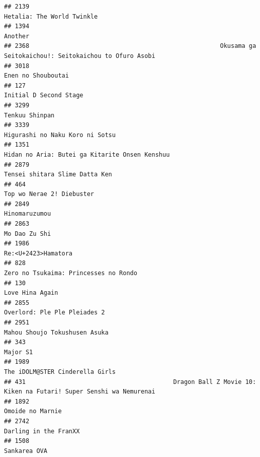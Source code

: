 \documentclass[
]{article}
\begin{document}
\begin{verbatim}
## 2139                                                                                Hetalia: The World Twinkle
## 1394                                                                                                   Another
## 2368                                                     Okusama ga Seitokaichou!: Seitokaichou to Ofuro Asobi
## 3018                                                                                        Enen no Shouboutai
## 127                                                                                     Initial D Second Stage
## 3299                                                                                            Tenkuu Shinpan
## 3339                                                                           Higurashi no Naku Koro ni Sotsu
## 1351                                                            Hidan no Aria: Butei ga Kitarite Onsen Kenshuu
## 2879                                                                            Tensei shitara Slime Datta Ken
## 464                                                                                  Top wo Nerae 2! Diebuster
## 2849                                                                                             Hinomaruzumou
## 2863                                                                                             Mo Dao Zu Shi
## 1986                                                                                       Re:<U+2423>Hamatora
## 828                                                                      Zero no Tsukaima: Princesses no Rondo
## 130                                                                                            Love Hina Again
## 2855                                                                              Overlord: Ple Ple Pleiades 2
## 2951                                                                             Mahou Shoujo Tokushusen Asuka
## 343                                                                                                   Major S1
## 1989                                                                           The iDOLM@STER Cinderella Girls
## 431                                         Dragon Ball Z Movie 10: Kiken na Futari! Super Senshi wa Nemurenai
## 1892                                                                                          Omoide no Marnie
## 2742                                                                                     Darling in the FranXX
## 1508                                                                                              Sankarea OVA

\end{verbatim}
\end{document}
